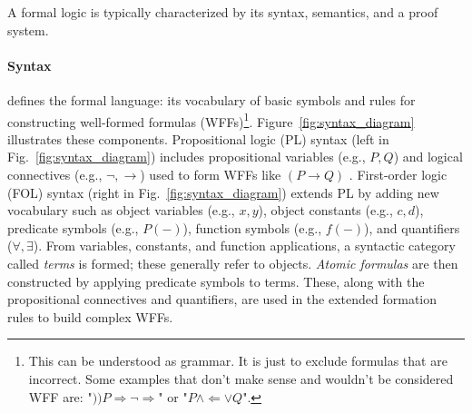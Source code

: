 A formal logic is typically characterized by its syntax, semantics, and a proof system.

\paragraph{Syntax} defines the formal language: its vocabulary of basic symbols and rules for constructing well-formed formulas (WFFs)\footnote{This can be understood as grammar. It is just to exclude formulas that are incorrect. Some examples that don't make sense and wouldn't be considered WFF are: "$))P\Rightarrow \neg\Rightarrow $" or "$P \land \Leftarrow \lor Q$".\cite[Sec.~2.3.3]{Agler2013SymbolicLogic}}. Figure~\ref{fig:syntax_diagram} illustrates these components. Propositional logic (PL) syntax (left in Fig.~\ref{fig:syntax_diagram}) includes propositional variables (e.g., $P, Q$) and logical connectives (e.g., $\neg, \rightarrow$) used to form WFFs like $(P \rightarrow Q)$ \cite[Sec.~2.3.3]{Agler2013SymbolicLogic}. First-order logic (FOL) syntax (right in Fig.~\ref{fig:syntax_diagram}) extends PL by adding new vocabulary such as object variables (e.g., $x,y$), object constants (e.g., $c,d$), predicate symbols (e.g., $P(-)$), function symbols (e.g., $f(-)$), and quantifiers ($\forall, \exists$). From variables, constants, and function applications, a syntactic category called \textit{terms} is formed; these generally refer to objects. \textit{Atomic formulas} are then constructed by applying predicate symbols to terms. These, along with the propositional connectives and quantifiers, are used in the extended formation rules to build complex WFFs.

